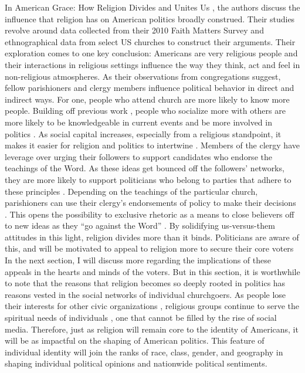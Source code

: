 \documentclass[letterpaper,man,natbib,noextraspace,12pt]{apa6}  %
\begin{document}
In American Grace: How Religion Divides and Unites Us \citep{putnam_american_2010}, the authors discuss the influence that religion has on American politics broadly construed. Their studies revolve around data collected from their 2010 Faith Matters Survey and ethnographical data from select US churches to construct their arguments. Their exploration comes to one key conclusion: Americans are very religious people and their interactions in religious settings influence the way they think, act and feel in non-religious atmospheres. As their observations from congregations suggest, fellow parishioners and clergy members influence political behavior in direct and indirect ways. For one, people who attend church are more likely to know more people. Building off previous work \citep{putnam_bowling_2001}, people who socialize more with others are more likely to be knowledgeable in current events and be more involved in politics \citep{huckfeldt2001social}. As social capital increases, especially from a religious standpoint, it makes it easier for religion and politics to intertwine \citep{putnam_american_2010}. Members of the clergy have leverage over urging their followers to support candidates who endorse the teachings of the Word. As these ideas get bounced off the followers’ networks, they are more likely to support politicians who belong to parties that adhere to these principles \citep{calfano_god_2009}.
Depending on the teachings of the particular church, parishioners can use their clergy’s endorsements of policy to make their decisions \citep{brown_race_2016}. This opens the possibility to exclusive rhetoric as a means to close believers off to new ideas as they “go against the Word” \citep{djupe_religious_2013}. By solidifying us-versus-them attitudes in this light, religion divides more than it binds. Politicians are aware of this, and will be motivated to appeal to religion more to secure their core voters \citep{calfano_god_2009, domke_god_2008} In the next section, I will discuss more regarding the implications of these appeals in the hearts and minds of the voters. But in this section, it is worthwhile to note that the reasons that religion becomes so deeply rooted in politics has reasons vested in the social networks of individual churchgoers. As people lose their interests for other civic organizations \citep{putnam_bowling_2001}, religious groups continue to serve the spiritual needs of individuals \citep{putnam_american_2010}, one that cannot be filled by the rise of social media. Therefore, just as religion will remain core to the identity of Americans, it will be as impactful on the shaping of American politics. This feature of individual identity will join the ranks of race, class, gender, and geography in shaping individual political opinions and nationwide political sentiments.
\end{document}
